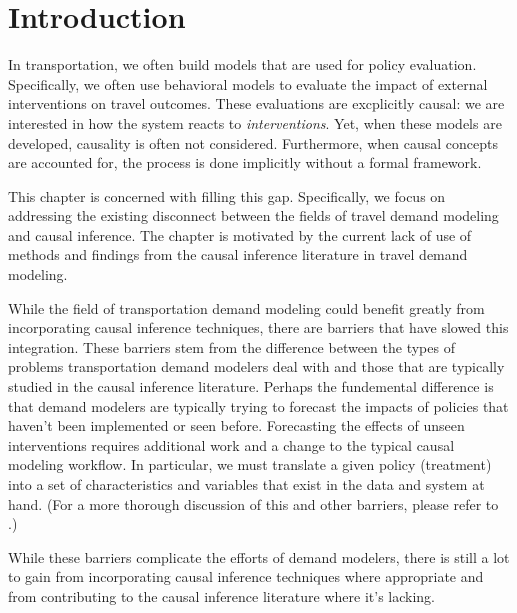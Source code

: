 \section{Introduction}
\label{sec:intro}

In transportation, we often build models that are used for policy evaluation.
Specifically, we often use behavioral models to evaluate the impact of external interventions on travel outcomes. 
These evaluations are excplicitly causal: we are interested in how the 
system reacts to \textit{interventions}. 
Yet, when these models are 
developed, causality is often not considered. Furthermore, when 
causal concepts are accounted for, the process is done implicitly without a 
formal framework. 

This chapter is concerned with filling this gap. 
Specifically, we focus on addressing the existing disconnect between the fields of travel demand modeling and causal inference. 
The chapter is motivated by the current lack of use of methods and findings from 
the causal inference literature in travel demand modeling. 

While the field of transportation demand modeling could benefit greatly from 
incorporating causal inference techniques, there are barriers that have slowed this integration. 
These barriers stem from the difference between the types of problems transportation demand modelers deal with and those that are typically studied in the causal inference literature. 
Perhaps the fundemental difference is that demand modelers are typically trying to forecast the impacts of policies that haven't been implemented or seen before.
Forecasting the effects of unseen interventions requires additional work and a change to the typical causal modeling workflow.
In particular, we must translate a given policy (treatment) into a set of characteristics and variables that exist in the data and system at hand.
(For a more thorough discussion of this and other barriers, please refer to \citet{brathwaite_2018_causal}.) 

While these barriers complicate the efforts of demand modelers, there is still a lot to gain from
incorporating causal inference techniques where appropriate and from contributing
to the causal inference literature where it's lacking.

